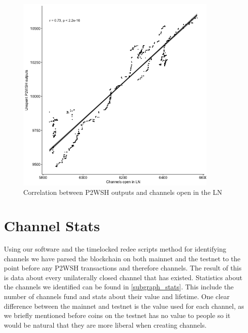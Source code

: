 \begin{figure}[t]
    \centering
    \includegraphics[width=10cm]{figures/graphs/channel_p2wsh_correlation_mainnnet.png}
    \caption{Correlation between P2WSH outputs and channels open in the LN}
    \label{fig:correlation}
\end{figure}


\section{Channel Stats}

Using our software and the timelocked redee scripts method for identifying channels we have parsed the blockchain on both mainnet and the testnet to the point before any P2WSH transactions and therefore channels. The result of this is data about every unilaterally closed channel that has existed. Statistics about the channels we identified can be found in \cref{subgraph_stats}. This include the number of channels fund and stats about their value and lifetime. One clear difference between the mainnet and testnet is the value used for each channel, as we briefly mentioned before coins on the testnet has no value to people so it would be natural that they are more liberal when creating channels. 


